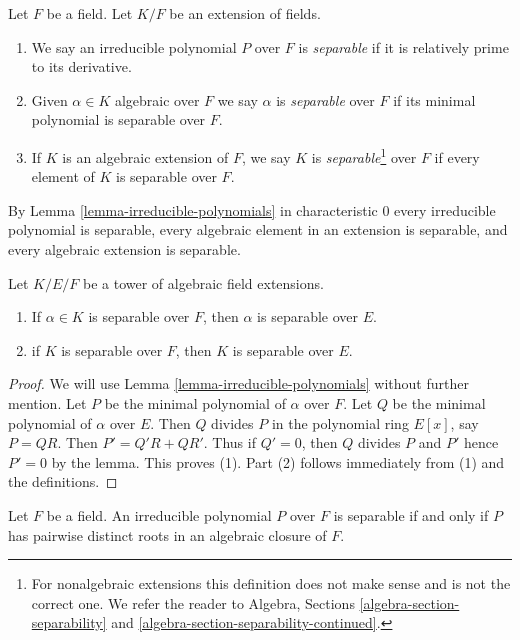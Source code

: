 \begin{definition}
\label{definition-separable}
Let $F$ be a field. Let $K/F$ be an extension of fields.
\begin{enumerate}
\item We say an irreducible polynomial $P$ over $F$ is {\it separable}
if it is relatively prime to its derivative.
\item Given $\alpha \in K$ algebraic over $F$ we say $\alpha$ is
{\it separable} over $F$ if its minimal polynomial is separable over $F$.
\item If $K$ is an algebraic extension of $F$, we say $K$ is
{\it separable}\footnote{For nonalgebraic extensions
this definition does not make sense and is not the correct one. We refer
the reader to Algebra, Sections \ref{algebra-section-separability} and
\ref{algebra-section-separability-continued}.}
over $F$ if every element of $K$ is separable over $F$.
\end{enumerate}
\end{definition}

\noindent
By Lemma \ref{lemma-irreducible-polynomials} in characteristic $0$ every
irreducible polynomial is separable, every algebraic element in an extension
is separable, and every algebraic extension is separable.

\begin{lemma}
\label{lemma-separable-goes-up}
Let $K/E/F$ be a tower of algebraic field extensions.
\begin{enumerate}
\item If $\alpha \in K$ is separable over $F$, then $\alpha$ is separable
over $E$.
\item if $K$ is separable over $F$, then $K$ is separable over $E$.
\end{enumerate}
\end{lemma}

\begin{proof}
We will use Lemma \ref{lemma-irreducible-polynomials} without further mention.
Let $P$ be the minimal polynomial of $\alpha$ over $F$.
Let $Q$ be the minimal polynomial of $\alpha$ over $E$.
Then $Q$ divides $P$ in the polynomial ring $E[x]$, say $P = QR$.
Then $P' = Q'R + QR'$. Thus if $Q' = 0$, then $Q$ divides $P$ and $P'$
hence $P' = 0$ by the lemma. This proves (1). Part (2)
follows immediately from (1) and the definitions.
\end{proof}

\begin{lemma}
\label{lemma-recognize-separable}
Let $F$ be a field. An irreducible polynomial $P$ over $F$
is separable if and only if $P$ has pairwise distinct roots in an
algebraic closure of $F$.
\end{lemma}

